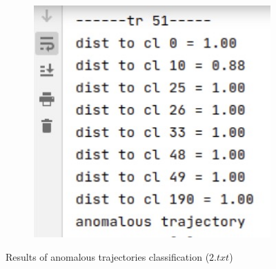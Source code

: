 \begin{figure}[!htb]
\begin{subfigure}[!htb]{0.70\textwidth}
		\caption{}
	\end{subfigure}
	\hfill
	\begin{subfigure}[!htb]{0.28\textwidth}
		\centering{}
		\includegraphics[width=\textwidth]{images/classif-res/classif-anom-res-2-2-stat.jpeg}
		\caption{}
	\end{subfigure}
	
	\caption{Results of anomalous trajectories classification ($2.txt$)}
	\label{fig:classif-anom-res-2}
\end{figure}